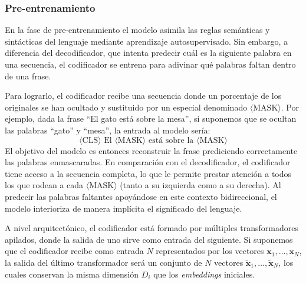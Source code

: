 \subsubsection{Pre-entrenamiento}
En la fase de pre-entrenamiento el modelo asimila las reglas semánticas y sintácticas del lenguaje mediante aprendizaje autosupervisado. Sin embargo, a diferencia del decodificador, que intenta predecir cuál es la siguiente palabra en una secuencia, el codificador se entrena para adivinar qué palabras faltan dentro de una frase. 

Para lograrlo, el codificador recibe una secuencia donde un porcentaje de los \tokens{} originales se han ocultado y sustituido por un \token{} especial denominado $\langle \text{MASK} \rangle$. Por ejemplo, dada la frase ``El gato está sobre la mesa'', si suponemos que se ocultan las palabras ``gato'' y ``mesa'', la entrada al modelo sería:
\[
\langle \text{CLS} \rangle \text{ El } \langle \text{MASK} \rangle \text{ está sobre la } \langle \text{MASK} \rangle
\]
El objetivo del modelo es entonces reconstruir la frase prediciendo correctamente las palabras enmascaradas. 
En comparación con el decodificador, el codificador tiene acceso a la secuencia completa, lo que le permite prestar atención a todos los \tokens{} que rodean a 
cada $\langle \text{MASK} \rangle$ (tanto a su izquierda como a su derecha). Al predecir las palabras faltantes apoyándose en este contexto bidireccional, 
el modelo interioriza de manera implícita el significado del lenguaje.

A nivel arquitectónico, el codificador está formado por múltiples transformadores apilados, donde la salida de uno sirve como entrada del siguiente. 
Si suponemos que el codificador recibe como entrada $N$ \tokens{} representados por los vectores $\mathbf{x}_1, \dots, \mathbf{x}_N$, la salida del último  transformador será un conjunto de $N$ vectores $\widetilde{\mathbf{x}}_1, \dots, \widetilde{\mathbf{x}}_N$, los cuales conservan la misma dimensión $D_i$ que los \textit{embeddings} iniciales. 


